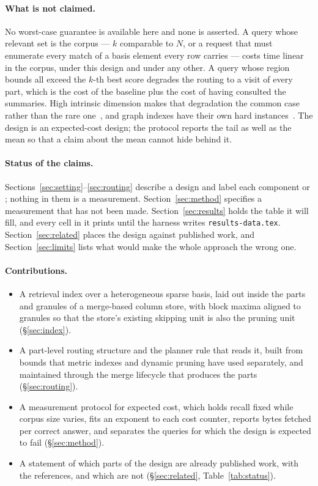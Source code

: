 \paragraph{What is not claimed.}
No worst-case guarantee is available here and none is asserted. A query whose
relevant set is the corpus --- $k$ comparable to $N$, or a request that must
enumerate every match of a basis element every row carries --- costs time
linear in the corpus, under this design and under any other. A query whose
region bounds all exceed the $k$-th best score degrades the routing to a visit
of every part, which is the cost of the baseline plus the cost of having
consulted the summaries. High intrinsic dimension makes that degradation the
common case rather than the rare one~\cite{weber1998quantitative,beyer1999nn},
and graph indexes have their own hard instances~\cite{indyk2023worst}. The
design is an expected-cost design; the protocol reports the tail as well as the
mean so that a claim about the mean cannot hide behind it.

\paragraph{Status of the claims.}
Sections~\ref{sec:setting}--\ref{sec:routing} describe a design and label each
component \prior{} or \proposed{}; nothing in them is a measurement.
Section~\ref{sec:method} specifies a measurement that has not been made.
Section~\ref{sec:results} holds the table it will fill, and every cell in it
prints \ph{} until the harness writes \texttt{results-data.tex}.
Section~\ref{sec:related} places the design against published work, and
Section~\ref{sec:limits} lists what would make the whole approach the wrong
one.

\paragraph{Contributions.}
\begin{itemize}[leftmargin=*]
\item A retrieval index over a heterogeneous sparse basis, laid out inside the
  parts and granules of a merge-based column store, with block maxima aligned
  to granules so that the store's existing skipping unit is also the pruning
  unit (\S\ref{sec:index}).
\item A part-level routing structure and the planner rule that reads it, built
  from bounds that metric indexes and dynamic pruning have used separately, and
  maintained through the merge lifecycle that produces the parts
  (\S\ref{sec:routing}).
\item A measurement protocol for expected cost, which holds recall fixed while
  corpus size varies, fits an exponent to each cost counter, reports bytes
  fetched per correct answer, and separates the queries for which the design is
  expected to fail (\S\ref{sec:method}).
\item A statement of which parts of the design are already published work, with
  the references, and which are not (\S\ref{sec:related}, Table~\ref{tab:status}).
\end{itemize}
